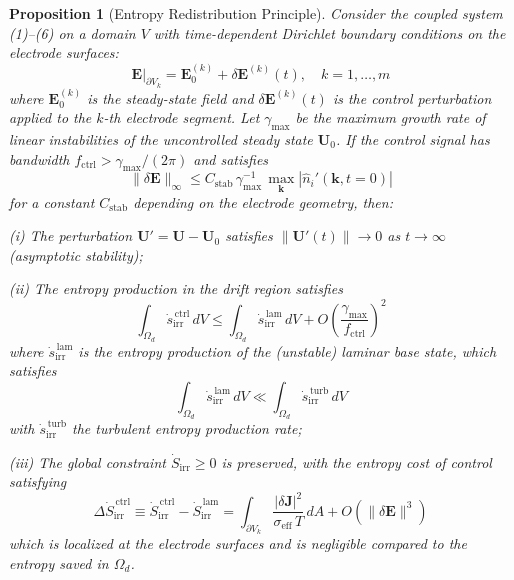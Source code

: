\documentclass[12pt,twocolumn]{article}
\newtheorem{proposition}[theorem]{Proposition}
\newcommand{\ee}{\mathbf{E}}
\newcommand{\jj}{\mathbf{J}}
\newcommand{\uu}{\mathbf{U}}
\newcommand{\Sdot}{\dot{S}_{\mathrm{irr}}}
\newcommand{\sdot}{\dot{s}_{\mathrm{irr}}}
\begin{document}
\begin{proposition}[Entropy Redistribution Principle]
\label{thm:entropy_redistribution}
Consider the coupled system \textnormal{(1)--(6)} on a domain $V$
with time-dependent Dirichlet boundary conditions on the electrode
surfaces:
\begin{equation}
  \ee\big|_{\partial V_k}
  = \ee_0^{(k)} + \delta\ee^{(k)}(t), \quad k = 1,\ldots,m
  \label{eq:BC}
\end{equation}
where $\ee_0^{(k)}$ is the steady-state field and
$\delta\ee^{(k)}(t)$ is the control perturbation applied to the
$k$-th electrode segment. Let $\gamma_{\max}$ be the maximum
growth rate of linear instabilities of the uncontrolled steady state
$\uu_0$. If the control signal has bandwidth
$f_{\mathrm{ctrl}} > \gamma_{\max}/(2\pi)$ and satisfies
\begin{equation}
  \|\delta\ee\|_{\infty}
  \leq C_{\mathrm{stab}}\,\gamma_{\max}^{-1}\,
  \max_{\mathbf{k}} |\hat{n}_i'(\mathbf{k}, t=0)|
  \label{eq:control_bound}
\end{equation}
for a constant $C_{\mathrm{stab}}$ depending on the electrode
geometry, then:

\noindent\textnormal{(i)} The perturbation $\uu' = \uu - \uu_0$
satisfies $\|\uu'(t)\| \to 0$ as $t \to \infty$ (asymptotic
stability);

\noindent\textnormal{(ii)} The entropy production in the drift
region satisfies
\begin{equation}
  \int_{\Omega_d} \sdot^{\,\mathrm{ctrl}} \, dV
  \leq \int_{\Omega_d} \sdot^{\,\mathrm{lam}} \, dV
  + O\!\left(\frac{\gamma_{\max}}{f_{\mathrm{ctrl}}}\right)^2
  \label{eq:entropy_drift_bound}
\end{equation}
where $\sdot^{\,\mathrm{lam}}$ is the entropy production of the
(unstable) laminar base state, which satisfies
\begin{equation}
  \int_{\Omega_d} \sdot^{\,\mathrm{lam}} \, dV
  \ll \int_{\Omega_d} \sdot^{\,\mathrm{turb}} \, dV
  \label{eq:lam_vs_turb}
\end{equation}
with $\sdot^{\,\mathrm{turb}}$ the turbulent entropy production rate;

\noindent\textnormal{(iii)} The global constraint $\Sdot \geq 0$
is preserved, with the entropy cost of control satisfying
\begin{equation}
  \Delta\Sdot^{\,\mathrm{ctrl}}
  \equiv \Sdot^{\,\mathrm{ctrl}} - \Sdot^{\,\mathrm{lam}}
  = \int_{\partial V_k} \frac{|\delta\jj|^2}{\sigma_{\mathrm{eff}}\,T}
    \, dA + O(\|\delta\ee\|^3)
  \label{eq:entropy_cost}
\end{equation}
which is localized at the electrode surfaces and is negligible
compared to the entropy \emph{saved} in $\Omega_d$.
\end{proposition}
\end{document}
